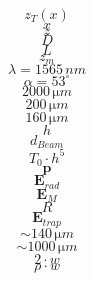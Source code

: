 \documentclass[a4paper,12t,BCOR12mm,toc=bibliography]{article}
\begin{document}
\begingroup
\fontsize{18pt}{15pt}\selectfont
$$z_{\si{T}}(x)$$
$$x$$
$$z$$
$$D$$
$$L$$
$$z_{\si{m}}$$
$$\lambda=1565\,\si{nm}$$
$$\alpha=53^\circ$$
$$2000\,\si{\micro m}$$
$$200\,\si{\micro m}$$
$$160\,\si{\micro m}$$
$$h$$
$$d_{\si{Beam}}$$
$$T_0\cdot h^5$$
$$\mathbf{p}$$
$$\mathbf{E}_{\si{rad}}$$
$$\mathbf{E}_{\si{M}}$$
$$R$$
$$\mathbf{E}_{\si{trap}}$$
$$\sim 140\,\si{\micro m}$$
$$\sim 1000\,\si{\micro m}$$
$$2\cdot w$$
$$\rho\cdot w$$
\endgroup
\end{document}
